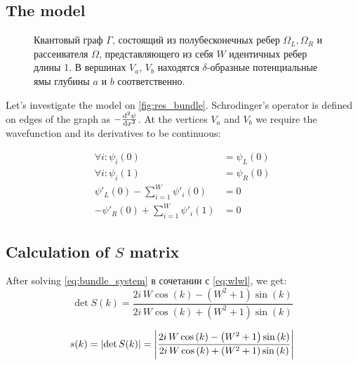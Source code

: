 \subsection{The model}
\begin{figure}
\centering
\begin{tikzpicture}[scale=1.1] %

\end{tikzpicture}
\caption{Квантовый граф $\Gamma$, состоящий из полубесконечных ребер $\Omega_L, \Omega_R$ и рассеивателя $\Omega$, представляющего из себя $W$ идентичных ребер длины 1. В вершинах $V_a$, $V_b$ находятся $\delta$-образные потенциальные ямы глубины $a$ и $b$ соответственно.}\label{fig:res_bundle}
\end{figure}

Let's investigate the model on \autoref{fig:res_bundle}. Schrodinger's operator is defined on edges of the graph as  $-\dv[2]{\psi}{x}$. At the vertices $V_a$ and $V_b$ we require the wavefunction and its derivatives to be continuous:

\begin{equation}\label{eq:bundle_system}
\begin{aligned}
   \forall i: \psi_i(0) &= \psi_L(0)
\\ \forall i: \psi_i(1) &= \psi_R(0)
\\ \psi'_L(0) - \sum\limits_{i = 1}^W \psi'_i(0) &= 0
\\ -\psi'_R(0) + \sum\limits_{i = 1}^W \psi'_i(1) &= 0
\end{aligned}
\end{equation}

\subsection{Calculation of $S$ matrix}
After solving \ref{eq:bundle_system} в сочетании с \ref{eq:wlwl}, we get:
\begin{equation*}
\det S(k) = \frac{2 i \, W \cos\left(k\right) - {\left(W^{2} + 1\right)} \sin\left(k\right)}{2 i \, W \cos\left(k\right) + {\left(W^{2} + 1\right)} \sin\left(k\right)}
\end{equation*}


\begin{equation}\label{eq:bundle_s}
s(k) = \abs{\det S(k)} = \abs{\frac{2 i \, W \cos\left(k\right) - {\left(W^{2} + 1\right)} \sin\left(k\right)}{2 i \, W \cos\left(k\right) + {\left(W^{2} + 1\right)} \sin\left(k\right)}}
\end{equation}

